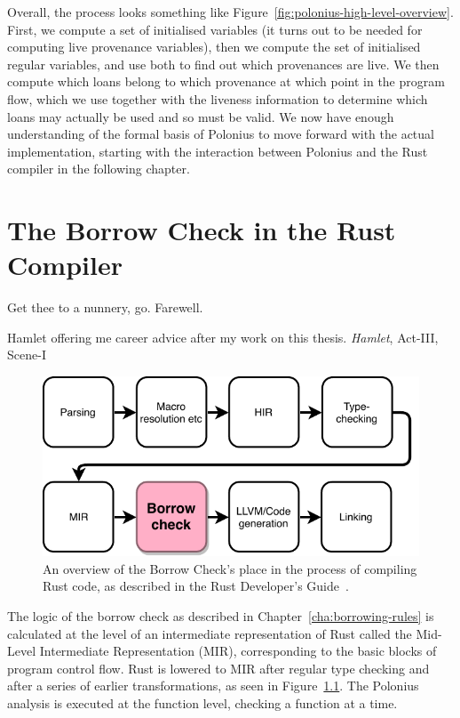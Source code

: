\documentclass[11pt,a4paper,twoside,openany]{report}
\renewcommand\_{\textunderscore\allowbreak}
\begin{document}
Overall, the process looks something like
Figure~\ref{fig:polonius-high-level-overview}. First, we compute a set of
initialised variables (it turns out to be needed for computing live provenance
variables), then we compute the set of initialised regular variables, and use
both to find out which provenances are live. We then compute which loans belong
to which provenance at which point in the program flow, which we use together
with the liveness information to determine which loans may actually be used and
so must be valid. We now have enough understanding of the formal basis of
Polonius to move forward with the actual implementation, starting with the
interaction between Polonius and the Rust compiler in the following chapter.


\chapter{The Borrow Check in the Rust Compiler}\label{cha:borrow-check-compiler}
\epigraph{Get thee to a nunnery, go. Farewell.}%
{Hamlet offering me career advice after my work on this thesis. \textit{Hamlet},
  Act-III, Scene-I}

\begin{figure}[h!]
  \includegraphics[width=0.9\linewidth]{Graphs/rustc-overview}
  \caption[The Rust Compilation Process]{An overview of the Borrow Check's place
    in the process of compiling Rust code, as described in the Rust Developer's
    Guide~\cite{rustc_developers_guide_nodate}.}\label{fig:rustc-overview}
\end{figure}

The logic of the borrow check as described in Chapter~\ref{cha:borrowing-rules}
is calculated at the level of an intermediate representation of Rust called the
Mid-Level Intermediate Representation (MIR), corresponding to the basic blocks
of program control flow. Rust is lowered to MIR after regular type checking and
after a series of earlier transformations, as seen in
Figure~\ref{fig:rustc-overview}. The Polonius analysis is executed at the
function level, checking a function at a time.
\end{document}
